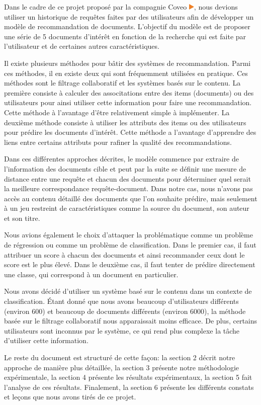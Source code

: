Dans le cadre de ce projet proposé par la compagnie Coveo \href{https://www.coveo.com/fr}{\includegraphics[height=0.3cm]{coveo_logo}}, nous devions utiliser un historique de requêtes faites par des utilisateurs afin de développer un modèle de recommandation de documents. 
L'objectif du modèle est de proposer une série de 5 documents d'intérêt en fonction de la recherche qui est faite par l'utilisateur et de certaines autres caractéristiques.
\break

Il existe plusieurs méthodes pour bâtir des systèmes de recommandation. Parmi ces méthodes, il en existe deux qui sont fréquemment utilisées en pratique. Ces méthodes sont le filtrage collaboratif et les systèmes basés sur le contenu. La première consiste à calculer des associtations entre des items (documents) ou des utilisateurs pour ainsi utiliser cette information pour faire une recommandation. Cette méthode à l'avantage d'être relativement simple à implémenter. La deuxième méthode consiste à utiliser les attributs des items ou des utilisateurs pour prédire les documents d'intérêt. Cette méthode a l'avantage d'apprendre des liens entre certains attributs pour rafiner la qualité des recommandations.

Dans ces différentes approches décrites, le modèle commence par extraire de l'information des documents cible et peut par la suite se définir une mesure de distance entre une requête et chacun des documents pour déterminer quel serait la meilleure correspondance requête-document. Dans notre cas, nous n'avons pas accès au contenu détaillé des documents que l'on souhaite prédire, mais seulement à un jeu restreint de caractéristiques comme la source du document, son auteur et son titre.

Nous avions également le choix d'attaquer la problématique comme un problème de régression ou comme un problème de classification. Dans le premier cas, il faut attribuer un score à chacun des documents et ainsi recommander ceux dont le score est le plus élevé. Dans le deuxième cas, il faut tenter de prédire directement une classe, qui correspond à un document en particulier. 

Nous avons décidé d'utiliser un système basé sur le contenu dans un contexte de classification. Étant donné que nous avons beaucoup d'utilisateurs différents (environ 600) et beaucoup de documents différents (environ 6000), la méthode basée sur le filtrage collaboratif nous apparaissait moins efficace. De plus, certains utilisateurs sont inconnus par le système, ce qui rend plus complexe la tâche d'utiliser cette information. 
\break

Le reste du document est structuré de cette façon: la section 2 décrit notre approche de manière plus détaillée, la section 3 présente notre méthodologie expérimentale, la section 4 présente les résultats expérimentaux, la section 5 fait l'analyse de ces résultats. Finalement, la section 6 présente les différents constats et leçons que nous avons tirés de ce projet.